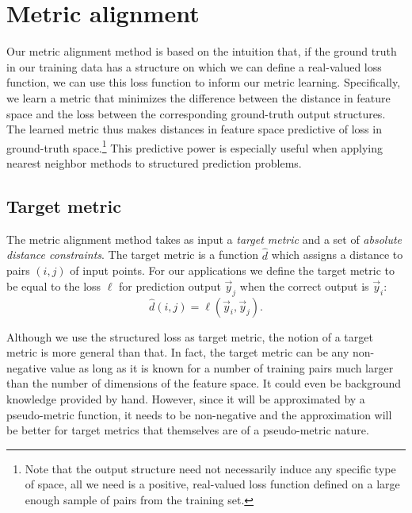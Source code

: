 \section{Metric alignment}

Our metric alignment method is based on the intuition that, if the ground truth in our training data has a structure on which we can define a real-valued loss function, we can use this loss function to inform our metric learning.
Specifically, we learn a metric that minimizes the difference between the distance in feature space and the loss between the corresponding ground-truth output structures.
The learned metric thus makes distances in feature space predictive of loss in ground-truth space.\footnote{Note that the output structure need not necessarily induce any specific type of space, all we need is a positive, real-valued loss function defined on a large enough sample of pairs from the training set.}
This predictive power is especially useful when applying nearest neighbor methods to structured prediction problems.



\subsection{Target metric}

The metric alignment method takes as input a \emph{target metric} and a set of \emph{absolute distance constraints}.
The target metric is a function $\hat{d}$ which assigns a distance to pairs $(i,j)$ of input points.
For our applications we define the target metric to be equal to the loss $\ell$ for prediction output $\vec{y}_j$ when the correct output is $\vec{y}_i$:
\begin{equation}
\hat{d}(i,j) = \ell(\vec{y}_i, \vec{y}_j).
\end{equation}

Although we use the structured loss as target metric, the notion of a target metric is more general than that.
In fact, the target metric can be any non-negative value as long as it is known for a number of training pairs much larger than the number of dimensions of the feature space.
It could even be background knowledge provided by hand.
However, since it will be approximated by a pseudo-metric function, it needs to be non-negative and the approximation will be better for target metrics that themselves are of a pseudo-metric nature.

